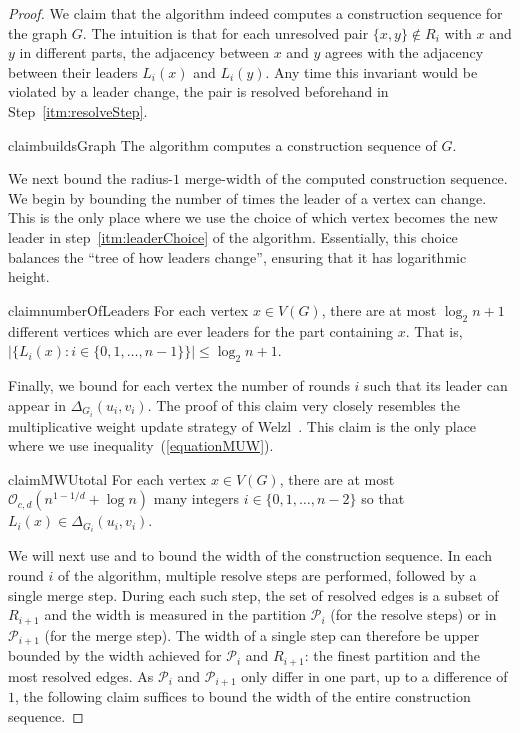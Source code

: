 \documentclass[11pt]{article}
\theoremstyle{definition}
\newcommand{\PP}{{\mathcal P}}
\newcommand{\inAppendix}{$\clubsuit$}%
\renewcommand{\leq}{\leqslant}
\newcommand{\set}[1]{\{#1\}}
\renewcommand{\cal}{\mathcal}
\begin{document}
\begin{proof}
    \bigskip
    
    We claim that the algorithm indeed computes a construction sequence for the graph $G$. The intuition is that for each unresolved pair $\set{x,y}\notin R_i$ with $x$ and $y$ in different parts, the adjacency between $x$ and $y$ agrees with the adjacency between their leaders $L_i(x)$ and $L_i(y)$. Any time this invariant would be violated by a leader change, the pair is resolved beforehand in Step~\ref{itm:resolveStep}.

    \begin{restatable}[\inAppendix{}]{claim}{buildsGraph}
    \label{clm:buildsGraph}
    The algorithm computes a construction sequence of $G$.
    \end{restatable}

     
    We next bound the radius-$1$ merge-width of the computed construction sequence. We begin by bounding the number of times the leader of a vertex can change. This  is the only place where we use the choice of which vertex becomes the new leader in step~\ref{itm:leaderChoice} of the algorithm. Essentially, this choice balances the ``tree of how leaders change'', ensuring that it has logarithmic height.

    \begin{restatable}[\inAppendix{}]{claim}{numberOfLeaders}
    \label{clm:numberOfLeaders}
        For each vertex $x \in V(G)$, there are at most $\log_2 n + 1$ different vertices which are ever leaders for the part containing $x$. That is, $|\{L_i(x): i \in \{0,1,\ldots, n-1\}\}|\leq\log_2 n + 1$.
    \end{restatable}

    Finally, we bound for each vertex the number of rounds \(i\) such that its leader can appear in $\Delta_{G_i}(u_i, v_i)$.
    The proof of this claim very closely resembles the multiplicative weight update strategy of Welzl~\cite{Welzl88, ChazelleWelzl89}. This claim is the only place where we use inequality~(\ref{equationMUW}).
    
    \begin{restatable}[\inAppendix{}]{claim}{MWUtotal}
    \label{clm:MWUtotal}
        For each vertex $x \in V(G)$, there are at most $\cal O_{c,d}(n^{1-1/d} + \log{n})$ many integers $i \in \{0,1,\ldots, n-2\}$ so that $L_i(x) \in \Delta_{G_i}(u_i,v_i)$.
    \end{restatable}
    \noindent 
    We will next use  and  to bound the width of the construction sequence. 
    In each round $i$ of the algorithm, multiple  resolve steps are performed, followed by a single merge step.
    During each such step, the set of resolved edges is a subset of $R_{i+1}$ and the width is measured in the partition $\PP_i$ (for the resolve steps) or in $\PP_{i+1}$ (for the merge step).
    The width of a single step can therefore be upper bounded by the width achieved for $\PP_i$ and $R_{i+1}$: the finest partition and the most resolved edges.
    As $\PP_i$ and $\PP_{i+1}$ only differ in one part, up to a difference of $1$, the following claim suffices to bound the width of the entire construction sequence.


\end{proof}
\end{document}
